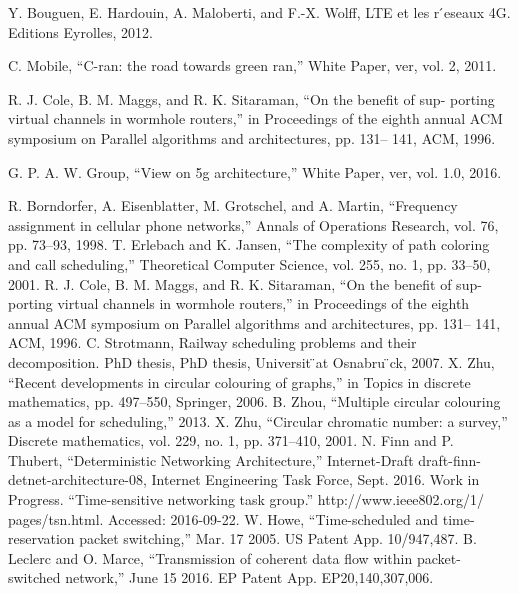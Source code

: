\documentclass[a4paper,10pt]{article}
\begin{document}


\begin{thebibliography}{abcde}
 
 Y. Bouguen, E. Hardouin, A. Maloberti, and F.-X. Wolff, LTE et les r ́eseaux 4G. Editions Eyrolles, 2012.

 C. Mobile, “C-ran: the road towards green ran,” White Paper, ver, vol. 2, 2011.

 R. J. Cole, B. M. Maggs, and R. K. Sitaraman, “On the benefit of sup- porting virtual channels in wormhole routers,” in Proceedings of the eighth annual ACM symposium on Parallel algorithms and architectures, pp. 131– 141, ACM, 1996.

 G. P. A. W. Group, “View on 5g architecture,” White Paper, ver, vol. 1.0, 2016.

 R. Borndorfer, A. Eisenblatter, M. Grotschel, and A. Martin, “Frequency assignment in cellular phone networks,” Annals of Operations Research, vol. 76, pp. 73–93, 1998.
 T. Erlebach and K. Jansen, “The complexity of path coloring and call scheduling,” Theoretical Computer Science, vol. 255, no. 1, pp. 33–50, 2001.
 R. J. Cole, B. M. Maggs, and R. K. Sitaraman, “On the benefit of sup- porting virtual channels in wormhole routers,” in Proceedings of the eighth annual ACM symposium on Parallel algorithms and architectures, pp. 131– 141, ACM, 1996.
 C. Strotmann, Railway scheduling problems and their decomposition. PhD thesis, PhD thesis, Universit ̈at Osnabru ̈ck, 2007.
 X. Zhu, “Recent developments in circular colouring of graphs,” in Topics in discrete mathematics, pp. 497–550, Springer, 2006.
 B. Zhou, “Multiple circular colouring as a model for scheduling,” 2013.
 X. Zhu, “Circular chromatic number: a survey,” Discrete mathematics, vol. 229, no. 1, pp. 371–410, 2001.
 N. Finn and P. Thubert, “Deterministic Networking Architecture,” Internet-Draft draft-finn-detnet-architecture-08, Internet Engineering Task Force, Sept. 2016. Work in Progress.
 “Time-sensitive networking task group.” http://www.ieee802.org/1/ pages/tsn.html. Accessed: 2016-09-22.
W. Howe, “Time-scheduled and time-reservation packet switching,” Mar. 17 2005. US Patent App. 10/947,487.
B. Leclerc and O. Marce, “Transmission of coherent data flow within packet-switched network,” June 15 2016. EP Patent App. EP20,140,307,006.


\end{thebibliography}
\end{document}
